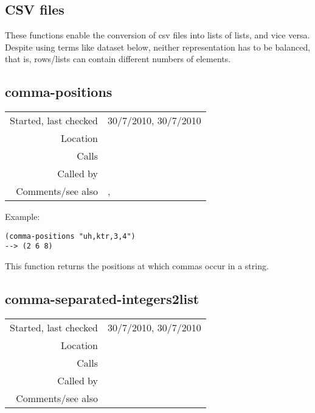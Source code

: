 \subsection{CSV files}\label{sec:csv-files}

These functions enable the conversion of csv files
into lists of lists, and vice versa. Despite using
terms like dataset below, neither representation has
to be balanced, that is, rows/lists can contain
different numbers of elements.


\subsection*{comma-positions}\label{fun:comma-positions}

\vspace{0.3cm}
\begin{tabular}{r|p{8cm}}
Started, last checked & 30/7/2010, 30/7/2010 \\
Location & \nameref{sec:csv-files} \\
Calls & \\
Called by & \nameref{fun:comma-separated-string2list} \\
Comments/see also & \nameref{fun:space-bar-positions}, \nameref{fun:tab-positions}
\end{tabular}

\vspace{0.5cm}
\noindent Example:
\begin{verbatim}
(comma-positions "uh,ktr,3,4")
--> (2 6 8)
\end{verbatim}

\noindent This function returns the positions at which
commas occur in a string.


\subsection*{comma-separated-integers2list}\label{fun:comma-separated-integers2list}

\vspace{0.3cm}
\begin{tabular}{r|p{8cm}}
Started, last checked & 30/7/2010, 30/7/2010 \\
Location & \nameref{sec:csv-files} \\
Calls & \nameref{fun:comma-separated-string2list} \\
Called by & \\
Comments/see also &
\end{tabular}


